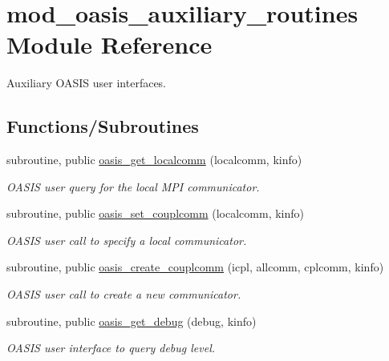 \hypertarget{namespacemod__oasis__auxiliary__routines}{}\section{mod\+\_\+oasis\+\_\+auxiliary\+\_\+routines Module Reference}
\label{namespacemod__oasis__auxiliary__routines}


Auxiliary O\+A\+S\+IS user interfaces.  


\subsection*{Functions/\+Subroutines}
\begin{DoxyCompactItemize}
\item 
subroutine, public \hyperlink{namespacemod__oasis__auxiliary__routines_a905dc11bc7613c7ac94054cf92fc2736}{oasis\+\_\+get\+\_\+localcomm} (localcomm, kinfo)
\begin{DoxyCompactList}\small\item\em O\+A\+S\+IS user query for the local M\+PI communicator. \end{DoxyCompactList}\item 
subroutine, public \hyperlink{namespacemod__oasis__auxiliary__routines_a42c3fe19a188de66499094e988c51938}{oasis\+\_\+set\+\_\+couplcomm} (localcomm, kinfo)
\begin{DoxyCompactList}\small\item\em O\+A\+S\+IS user call to specify a local communicator. \end{DoxyCompactList}\item 
subroutine, public \hyperlink{namespacemod__oasis__auxiliary__routines_aede33b301679f532ecd300488358ab71}{oasis\+\_\+create\+\_\+couplcomm} (icpl, allcomm, cplcomm, kinfo)
\begin{DoxyCompactList}\small\item\em O\+A\+S\+IS user call to create a new communicator. \end{DoxyCompactList}\item 
subroutine, public \hyperlink{namespacemod__oasis__auxiliary__routines_a940777065691d5eab0402b0bb40464c7}{oasis\+\_\+get\+\_\+debug} (debug, kinfo)
\begin{DoxyCompactList}\small\item\em O\+A\+S\+IS user interface to query debug level. \end{DoxyCompactList}\item 

\end{DoxyCompactItemize}
